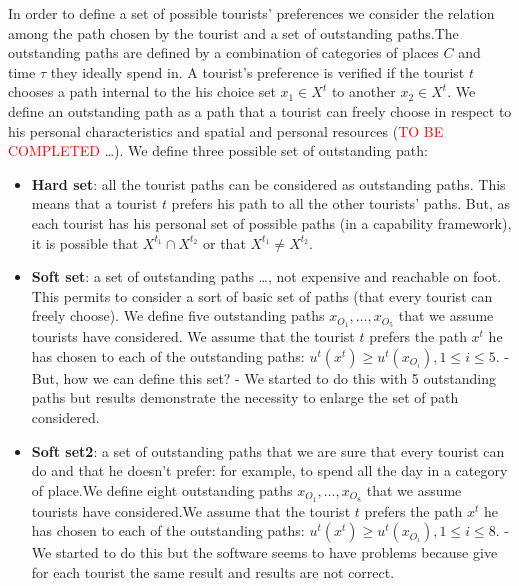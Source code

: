 \documentclass[a4paper]{article}
\begin{document}
In order to define a set of  possible tourists' preferences we consider the relation among the path chosen by the tourist and a set of outstanding paths.The outstanding paths are defined by a combination of categories of places $C$ and time $\tau$ they ideally spend in. A tourist's preference is verified if the tourist $t$ chooses a path internal to the his choice set $x_1 \in X^t$ to another $x_2 \in X^t$. We define an outstanding path as a path that a tourist can freely choose in respect to his personal characteristics and spatial and personal resources (\textcolor{red}{TO BE COMPLETED} \dots). We define three possible set of outstanding path:
                                            \begin{itemize}
                                                \item \textbf{Hard set}: all the tourist paths can be considered as outstanding paths. This means that a tourist $t$ prefers his path to all the other tourists' paths. But, as each tourist has his personal set of possible paths (in a capability framework), it is possible that $X^{t_1}\cap X^{t_2}$ or that $X^{t_1}\neq X^{t_2}$.
                                                \item \textbf{Soft set}: a set of outstanding paths \dots , not expensive and reachable on foot. This permits to consider a sort of basic set of paths (that every tourist can freely choose). We define five outstanding paths $x_{O_1}, \ldots, x_{O_5}$ that we assume tourists have considered. We assume that the tourist $t$ prefers the path $x^t$ he has chosen to each of the outstanding paths: $u^t(x^t) \geq u^t(x_{O_i}), 1 \leq  i \leq 5$.
                                                    \subitem - But, how we can define this set?
                                                    \subitem - We started to do this with 5 outstanding paths but results demonstrate the necessity to enlarge the set of path considered. 
                                                \item \textbf{Soft set2}: a set of outstanding paths that we are sure that every tourist can do and that he doesn't prefer: for example, to spend all the day in a category of place.We define eight outstanding paths $x_{O_1}, \ldots, x_{O_8}$ that we assume tourists have considered.We assume that the tourist $t$ prefers the path $x^t$ he has chosen to each of the outstanding paths: $u^t(x^t) \geq u^t(x_{O_i}), 1 \leq  i \leq 8$.
                                                    \subitem - We started to do this but the software seems to have problems because give for each tourist the same result and results are not correct.
                                              \end{itemize}
\end{document}
